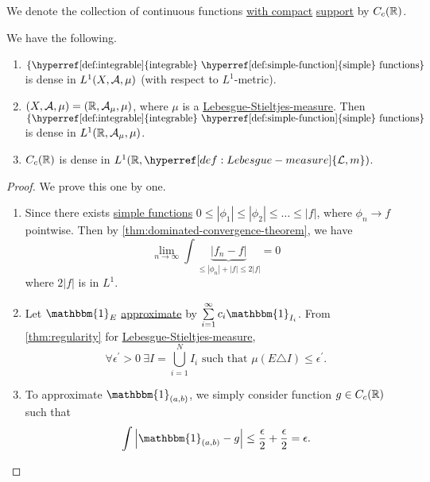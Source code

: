 \begin{notation}
	We denote the collection of continuous functions \underline{with compact} \hyperref[def:support]{support}
	by \(C_c(\mathbb{\MakeUppercase{r}} )\).
\end{notation}

\begin{theorem}
	We have the following.
	\begin{enumerate}
		\item \(\{\text{\hyperref[def:integrable]{integrable} \hyperref[def:simple-function]{simple} functions} \}\) is dense
		      in \(L^1(X, \mathcal{\MakeUppercase{a}} , \mu )\) (with respect to \(L^1\)-metric).
		\item \((X, \mathcal{\MakeUppercase{a}} , \mu ) = (\mathbb{\MakeUppercase{r}} , \mathcal{\MakeUppercase{a}} _\mu , \mu )\),
		      where \(\mu\) is a \hyperref[def:Lebesgue-Stieltjes-measure]{Lebesgue-Stieltjes-measure}. Then
		      \(\{\text{\hyperref[def:integrable]{integrable} \hyperref[def:simple-function]{simple} functions} \}\)
		      is dense in \(L^1(\mathbb{\MakeUppercase{r}} , \mathcal{\MakeUppercase{a}} _\mu , \mu )\).
		\item \(C_c(\mathbb{\MakeUppercase{r}} )\) is dense in \(L^1(\mathbb{\MakeUppercase{r}} , \hyperref[def:Lebesgue-measure]{\mathcal{\MakeUppercase{l}} , m})\).
	\end{enumerate}
\end{theorem}
\begin{proof}
	We prove this one by one.
	\begin{enumerate}
		\item Since there exists \hyperref[def:simple-function]{simple functions} \(0\leq \left\vert \phi _1 \right\vert \leq \left\vert \phi _2 \right\vert\leq \ldots \leq \left\vert f \right\vert  \),
		      where \(\phi _{n}\to f\) pointwise. Then by \autoref{thm:dominated-convergence-theorem}, we have
		      \[
			      \lim\limits_{n \to \infty} \int \underbrace{\left\vert f_{n} - f\right\vert }_{\leq \left\vert \phi _{n} \right\vert + \left\vert f  \right\vert\leq 2\left\vert f \right\vert } = 0
		      \]
		      where \(2\left\vert f \right\vert \) is in \(L^1\).
		\item Let \(\mathbbm{1}_{E} \) \underline{approximate} by \(\sum\limits_{i=1}^{\infty} c_{i}\mathbbm{1}_{I_{i}} \). From \autoref{thm:regularity} for
		      \hyperref[def:Lebesgue-Stieltjes-measure]{Lebesgue-Stieltjes-measure},
		      \[
			      \forall \epsilon ^\prime >0\ \exists I = \bigcup\limits_{i=1}^{N} I_{i}\text{ such that } \mu (E\triangle I)\leq \epsilon ^\prime .
		      \]
		\item To approximate \(\mathbbm{1}_{(a, b)} \), we simply consider function \(g\in C_c(\mathbb{\MakeUppercase{r}} )\) such that
		      \[
			      \int \left\vert \mathbbm{1}_{(a, b)} - g \right\vert \leq \frac{\epsilon}{2} + \frac{\epsilon}{2} = \epsilon .
		      \]
	\end{enumerate}
\end{proof}

